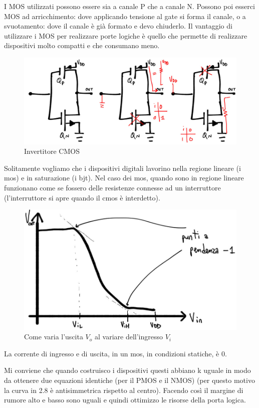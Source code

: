 \documentclass[
]{book}
\begin{document}
I MOS utilizzati possono essere sia a canale P che a canale N. Possono
poi esserci MOS ad arricchimento: dove applicando tensione al gate si
forma il canale, o a svuotamento: dove il canale è già formato e devo
chiuderlo. Il vantaggio di utilizzare i MOS per realizzare porte logiche
è quello che permette di realizzare dispositivi molto compatti e che
consumano meno.

\begin{figure}
\centering
\includegraphics[width=0.4\linewidth,height=\textheight,keepaspectratio]{immagini/24.jpg}
\caption{Invertitore CMOS}
\end{figure}

Solitamente vogliamo che i dispositivi digitali lavorino nella regione
lineare (i mos) e in saturazione (i bjt). Nel caso dei mos, quando sono
in regione lineare funzionano come se fossero delle resistenze connesse
ad un interruttore (l'interruttore si apre quando il cmos è interdetto).

\begin{figure}
\centering
\includegraphics[width=0.5\linewidth,height=\textheight,keepaspectratio]{immagini/25.jpg}
\caption{Come varia l'uscita \(V_o\) al variare dell'ingresso \(V_i\)}
\end{figure}

La corrente di ingresso e di uscita, in un mos, in condizioni statiche,
è 0.

Mi conviene che quando costruisco i dispositivi questi abbiano k uguale
in modo da ottenere due equazioni identiche (per il PMOS e il NMOS) (per
questo motivo la curva in 2.8 è antisimmetrica rispetto al centro).
Facendo così il margine di rumore alto e basso sono uguali e quindi
ottimizzo le risorse della porta logica.
\end{document}
